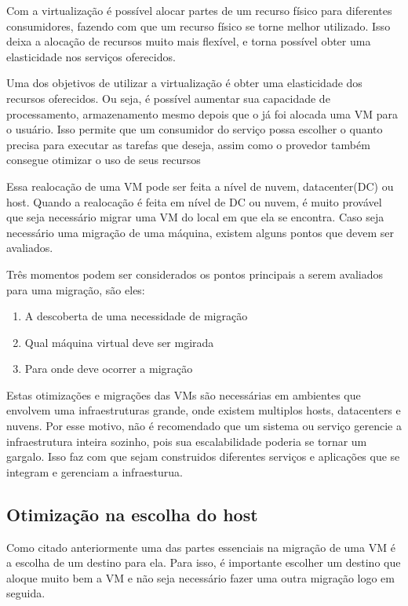 Com a virtualização é possível alocar partes de um recurso físico para diferentes consumidores, 
fazendo com que um recurso físico se torne melhor utilizado. Isso deixa a alocação de recursos
muito mais flexível, e torna possível obter uma elasticidade nos serviços oferecidos. 

Uma dos objetivos de utilizar a virtualização é obter uma elasticidade dos recursos oferecidos.
Ou seja, é possível aumentar sua capacidade de processamento, armazenamento mesmo depois que o
já foi alocada uma VM para o usuário. 
Isso permite que um consumidor do  serviço possa escolher o quanto precisa para executar as tarefas que deseja, 
assim como o provedor também consegue otimizar o uso de seus recursos

Essa realocação de uma VM pode ser feita a nível de nuvem, datacenter(DC) ou host. 
Quando a realocação é feita em nível de DC ou nuvem, é muito provável que seja 
necessário migrar uma VM do local em que ela se encontra. 
Caso seja necessário uma migração de uma máquina, existem alguns pontos que devem ser avaliados.

Três momentos podem ser considerados os pontos principais a serem avaliados para uma migração, 
são eles:

\begin{enumerate}
\item A descoberta de uma necessidade de migração
\item Qual máquina virtual deve ser mgirada
\item Para onde deve ocorrer a migração
\end{enumerate}

Estas otimizações e migrações das VMs são necessárias em ambientes que envolvem uma infraestruturas
grande, onde existem multiplos hosts, datacenters e nuvens. Por esse motivo, não é recomendado que 
um sistema ou serviço gerencie a infraestrutura inteira sozinho, pois sua escalabilidade 
poderia se tornar um gargalo. Isso faz com que sejam construidos diferentes serviços e aplicações 
que se integram e gerenciam a infraesturua.

\subsection{Otimização na escolha do host}
Como citado anteriormente uma das partes essenciais na migração de uma VM é a escolha de um destino para ela.
Para isso, é importante escolher um destino que aloque muito bem a VM e não seja necessário fazer uma outra
migração logo em seguida. 
